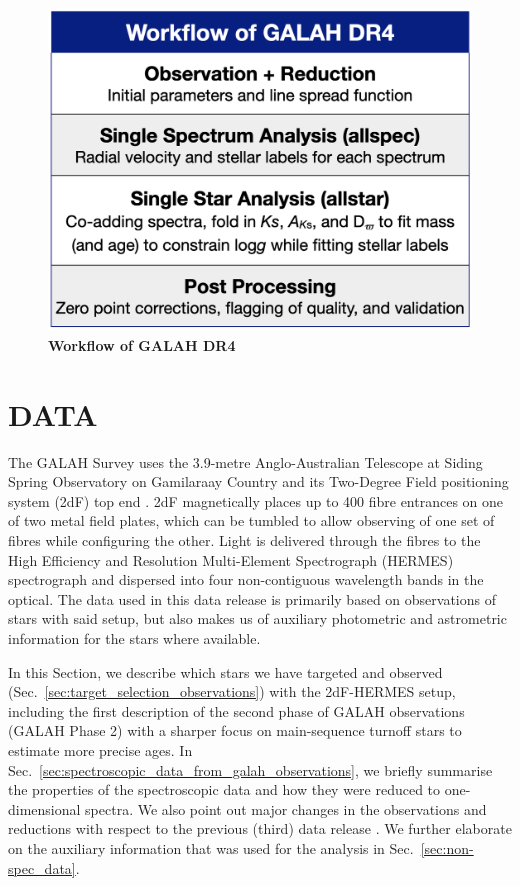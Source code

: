 \documentclass[
  journal=pasa,
  manuscript=research-paper, %
  year=2023,
  volume=37
]{cup-journal}
\begin{document}
\begin{figure}[ht]
 \centering
 \includegraphics[width=\textwidth]{figures/workflow_galah_dr4.png}
 \caption{\textbf{Workflow of GALAH DR4}}
 \label{fig:workflow_galah_dr4}
\end{figure}

\section{DATA}
\label{sec:data}

The GALAH Survey uses the 3.9-metre Anglo-Australian Telescope at Siding Spring Observatory on Gamilaraay Country and its Two-Degree Field positioning system (2dF) top end \citep{Lewis2002}. 2dF magnetically places up to 400 fibre entrances on one of two metal field plates, which can be tumbled to allow observing of one set of fibres while configuring the other. Light is delivered through the fibres to the High Efficiency and Resolution Multi-Element Spectrograph (HERMES) spectrograph \citep{Barden2010, Brzeski2011, Heijmans2012, Farrell2014, Sheinis2015} and dispersed into four non-contiguous wavelength bands in the optical. The data used in this data release is primarily based on observations of stars with said setup, but also makes us of auxiliary photometric and astrometric information for the stars where available.

In this Section, we describe which stars we have targeted and observed (Sec.~\ref{sec:target_selection_observations}) with the 2dF-HERMES setup, including the first description of the second phase of GALAH observations (GALAH Phase 2) with a sharper focus on main-sequence turnoff stars to estimate more precise ages. In Sec.~\ref{sec:spectroscopic_data_from_galah_observations}, we briefly summarise the properties of the spectroscopic data and how they were reduced to one-dimensional spectra. We also point out major changes in the observations and reductions with respect to the previous (third) data release \citep{Buder2021}. We further elaborate on the auxiliary information that was used for the analysis in Sec.~\ref{sec:non-spec_data}.
\end{document}
